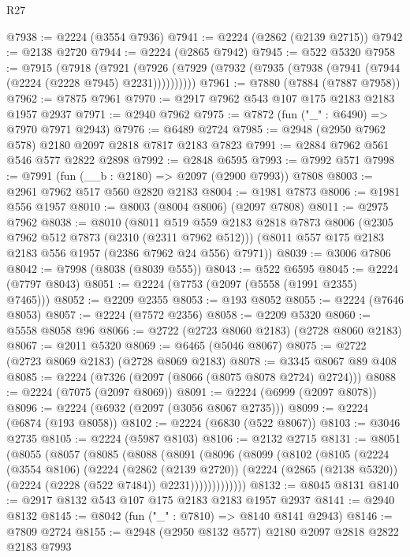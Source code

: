 \begin{lexlean}{R27}
\begin{coremodule}
@7938 := @2224 (@3554 @7936)
@7941 := @2224 (@2862 (@2139 @2715))
@7942 := @2138 @2720
@7944 := @2224 (@2865 @7942)
@7945 := @522 @5320
@7958 := @7915
    (@7918
      (@7921 (@7926 (@7929 (@7932 (@7935 (@7938 (@7941 (@7944 (@2224 (@2228 @7945) @2231))))))))))
@7961 := @7880 (@7884 (@7887 @7958))
@7962 := @7875 @7961
@7970 := @2917 @7962 @543 @107 @175 @2183 @2183 @1957 @2937
@7971 := @2940 @7962
@7975 := @7872 (fun ("_" : @6490) => @7970 @7971 @2943)
@7976 := @6489 @2724
@7985 := @2948 (@2950 @7962 @578) @2180 @2097 @2818 @7817 @2183 @7823
@7991 := @2884 @7962 @561 @546 @577 @2822 @2898
@7992 := @2848 @6595
@7993 := @7992 @571
@7998 := @7991 (fun (__b : @2180) => @2097 (@2900 @7993)) @7808
@8003 := @2961 @7962 @517 @560 @2820 @2183
@8004 := @1981 @7873
@8006 := @1981 @556 @1957
@8010 := @8003 (@8004 @8006) (@2097 @7808)
@8011 := @2975 @7962
@8038 := @8010
    (@8011
      @519
      @559
      @2183
      @2818
      @7873
      @8006
      (@2305 @7962 @512 @7873 (@2310 (@2311 @7962 @512)))
      (@8011 @557 @175 @2183 @2183 @556 @1957 (@2386 @7962 @24 @556) @7971))
@8039 := @3006 @7806
@8042 := @7998 (@8038 (@8039 @555))
@8043 := @522 @6595
@8045 := @2224 (@7797 @8043)
@8051 := @2224 (@7753 (@2097 (@5558 (@1991 @2355) @7465)))
@8052 := @2209 @2355
@8053 := @193 @8052
@8055 := @2224 (@7646 @8053)
@8057 := @2224 (@7572 @2356)
@8058 := @2209 @5320
@8060 := @5558 @8058 @96
@8066 := @2722 (@2723 @8060 @2183) (@2728 @8060 @2183)
@8067 := @2011 @5320
@8069 := @6465 (@5046 @8067)
@8075 := @2722 (@2723 @8069 @2183) (@2728 @8069 @2183)
@8078 := @3345 @8067 @89 @408
@8085 := @2224 (@7326 (@2097 (@8066 (@8075 @8078 @2724) @2724)))
@8088 := @2224 (@7075 (@2097 @8069))
@8091 := @2224 (@6999 (@2097 @8078))
@8096 := @2224 (@6932 (@2097 (@3056 @8067 @2735)))
@8099 := @2224 (@6874 (@193 @8058))
@8102 := @2224 (@6830 (@522 @8067))
@8103 := @3046 @2735
@8105 := @2224 (@5987 @8103)
@8106 := @2132 @2715
@8131 := @8051
    (@8055
      (@8057
        (@8085
          (@8088
            (@8091
              (@8096
                (@8099
                  (@8102
                    (@8105
                      (@2224
                        (@3554 @8106)
                        (@2224
                          (@2862 (@2139 @2720))
                          (@2224
                            (@2865 (@2138 @5320))
                            (@2224 (@2228 (@522 @7484)) @2231)))))))))))))
@8132 := @8045 @8131
@8140 := @2917 @8132 @543 @107 @175 @2183 @2183 @1957 @2937
@8141 := @2940 @8132
@8145 := @8042 (fun ("_" : @7810) => @8140 @8141 @2943)
@8146 := @7809 @2724
@8155 := @2948 (@2950 @8132 @577) @2180 @2097 @2818 @2822 @2183 @7993

\end{coremodule}
\end{lexlean}
